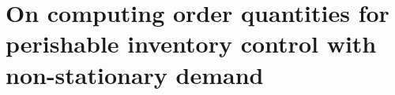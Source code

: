 
%
%
%
%
%
%
%
%

\chapter{On computing order quantities for perishable inventory control with non-stationary demand} %
\label{Chap:iccsa2015}

\ifpdf
    \graphicspath{{X/figures/PNG/}{X/figures/PDF/}{X/figures/}}
\else
    \graphicspath{{X/figures/EPS/}{X/figures/}}
\fi

%
%
%
%


